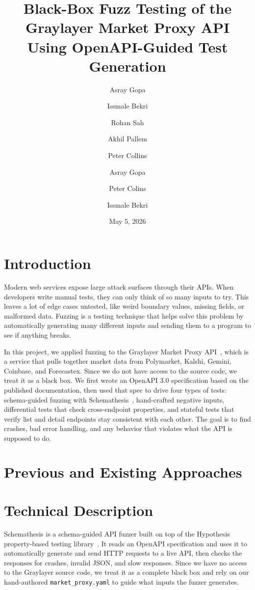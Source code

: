 \documentclass[12pt]{article}
\title{
  \textbf{Black-Box Fuzz Testing of the Graylayer Market Proxy API \\
  Using OpenAPI-Guided Test Generation}
}
\author{
  Asray Gopa \and
  Issmale Bekri \and
  Rohan Sah \and
  Akhil Pallem \and
  Peter Collins
}
\date{May 5, 2026}
\begin{document}
\maketitle

\section{Introduction}
\label{sec:intro}
\author{Asray Gopa}

Modern web services expose large attack surfaces through their APIs.
When developers write manual tests, they can only think of so many
inputs to try. This leaves a lot of edge cases untested, like weird
boundary values, missing fields, or malformed data. Fuzzing is a
testing technique that helps solve this problem by automatically
generating many different inputs and sending them to a program to
see if anything breaks.

In this project, we applied fuzzing to the Graylayer Market Proxy
API~\cite{graylayer_docs}, which is a service that pulls together
market data from Polymarket, Kalshi, Gemini, Coinbase, and
Forecastex. Since we do not have access to the source code, we treat
it as a black box. We first wrote an OpenAPI 3.0 specification based
on the published documentation, then used that spec to drive four
types of tests: schema-guided fuzzing with
Schemathesis~\cite{schemathesis_docs}, hand-crafted negative inputs,
differential tests that check cross-endpoint properties, and stateful
tests that verify list and detail endpoints stay consistent with each
other. The goal is to find crashes, bad error handling, and any
behavior that violates what the API is supposed to do.

\section{Previous and Existing Approaches}
\author{Peter Colins}
\label{sec:prev}


\section{Technical Description}
\author{Issmale Bekri}
\label{sec:tech}

Schemathesis is a schema-guided API fuzzer built on top of the
Hypothesis property-based testing library~\cite{hypothesis_docs}.
It reads an OpenAPI specification and uses it to automatically
generate and send HTTP requests to a live API, then checks the
responses for crashes, invalid JSON, and slow responses. Since
we have no access to the Graylayer source code, we treat it as a
complete black box and rely on our hand-authored
\texttt{market\_proxy.yaml} to guide what inputs the fuzzer generates.
\end{document}
